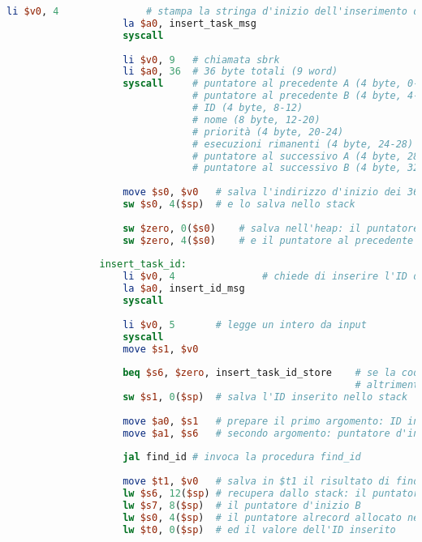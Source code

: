 \begin{center}
\begin{lstlisting}[language=mips, gobble=14, stepnumber=1]
                    li $v0, 4               # stampa la stringa d'inizio dell'inserimento di un task
                    la $a0, insert_task_msg
                    syscall
                    
                    li $v0, 9   # chiamata sbrk
                    li $a0, 36  # 36 byte totali (9 word)
                    syscall     # puntatore al precedente A (4 byte, 0-4)
                                # puntatore al precedente B (4 byte, 4-8)
                                # ID (4 byte, 8-12)
                                # nome (8 byte, 12-20)
                                # priorità (4 byte, 20-24)
                                # esecuzioni rimanenti (4 byte, 24-28)
                                # puntatore al successivo A (4 byte, 28-32)
                                # puntatore al successivo B (4 byte, 32-36)
                                
                    move $s0, $v0   # salva l'indirizzo d'inizio dei 36 byte allocati in $s0
                    sw $s0, 4($sp)	# e lo salva nello stack
                    
                    sw $zero, 0($s0)    # salva nell'heap: il puntatore al precedente A
                    sw $zero, 4($s0)    # e il puntatore al precedente B
                    
                insert_task_id:
                    li $v0, 4				# chiede di inserire l'ID del task
                    la $a0, insert_id_msg
                    syscall
                    
                    li $v0, 5		# legge un intero da input
                    syscall
                    move $s1, $v0
                    
                    beq $s6, $zero, insert_task_id_store	# se la coda è vuota, salva l'ID inserito
                											# altrimenti
                    sw $s1, 0($sp)	# salva l'ID inserito nello stack
                    
                    move $a0, $s1	# prepare il primo argomento: ID inserito
                    move $a1, $s6	# secondo argomento: puntatore d'inizio A
                    
                    jal find_id	# invoca la procedura find_id
                    
                    move $t1, $v0	# salva in $t1 il risultato di find_id
                    lw $s6, 12($sp)	# recupera dallo stack: il puntatore d'inizio A
                    lw $s7, 8($sp)	# il puntatore d'inizio B
                    lw $s0, 4($sp)	# il puntatore alrecord allocato nell'heap
                    lw $t0, 0($sp)	# ed il valore dell'ID inserito
                    

\end{lstlisting}
\end{center}
